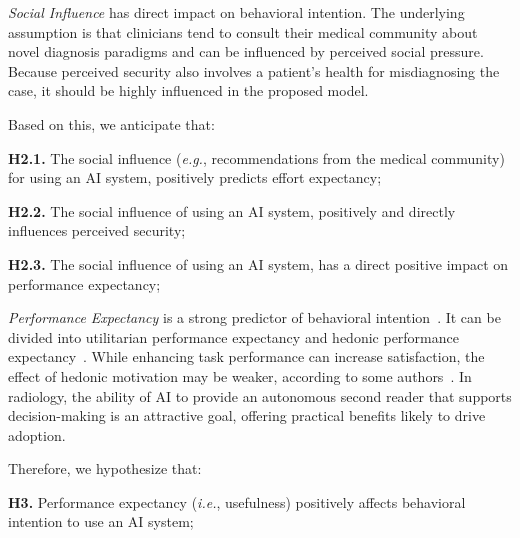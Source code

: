 \vspace{2.00mm}

{\it Social Influence} has direct impact on behavioral intention.
The underlying assumption is that clinicians tend to consult their medical community about novel diagnosis paradigms and can be influenced by perceived social pressure.
Because perceived security also involves a patient's health for misdiagnosing the case, it should be highly influenced in the proposed model.

\vspace{2.00mm}

\noindent
Based on this, we anticipate that:

\vspace{2.00mm}

\noindent
{\bf H2.1.} The social influence ({\it e.g.}, recommendations from the medical community) for using an \ac{AI} system, positively predicts effort expectancy;

\vspace{2.00mm}

\noindent
{\bf H2.2.} The social influence of using an \ac{AI} system, positively and directly influences perceived security;

\vspace{2.00mm}

\noindent
{\bf H2.3.} The social influence of using an \ac{AI} system, has a direct positive impact on performance expectancy;

\vspace{2.00mm}

{\it Performance Expectancy} is a strong predictor of behavioral intention~\cite{KHALILZADEH2017460}.
It can be divided into utilitarian performance expectancy and hedonic performance expectancy~\cite{CALISTO2022102922}.
While enhancing task performance can increase satisfaction, the effect of hedonic motivation may be weaker, according to some authors~\cite{HART201993}.
In radiology, the ability of \ac{AI} to provide an autonomous second reader that supports decision-making is an attractive goal, offering practical benefits likely to drive adoption.

\vspace{2.00mm}

\noindent
Therefore, we hypothesize that:

\vspace{2.00mm}

\noindent
{\bf H3.} Performance expectancy ({\it i.e.}, usefulness) positively affects behavioral intention to use an \ac{AI} system;

